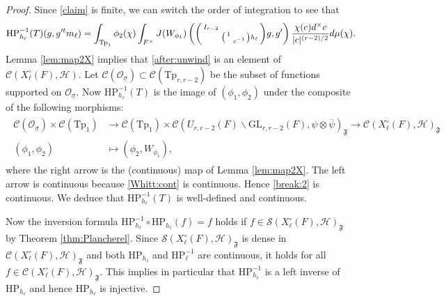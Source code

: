 \documentclass[12pt]{amsart}
\theoremstyle{remark}
\numberwithin{equation}{section}
\newcommand{\GL}{\mathrm{GL}}
\newcommand{\lto}{\longrightarrow}
\theoremstyle{definition}
\newenvironment{psmatrix}
  {\left(\begin{smallmatrix}}
  {\end{smallmatrix}\right)}
\numberwithin{equation}{subsection}
\begin{document}
\begin{proof}
Since \eqref{claim} is finite, we can switch the order of integration to see that 
\begin{align} \label{after:unwind}
\mathrm{HP}_{h_\ell}^{-1}(T)(g,g'^tm_\ell)=\int_{\mathrm{Tp}_1}\phi_2(\chi)\int_{F^\times}
J(W_{\phi_1})\left(\begin{psmatrix}I_{r-2} & \\ & \begin{psmatrix} 1 & \\ & c^{-1} \end{psmatrix}h_\ell \end{psmatrix}g,g' \right)
\frac{\chi(c) d^\times c}{|c|^{(r-2)/2}}d\mu( \chi).
\end{align}
 Lemma \ref{lem:map2X} implies that \eqref{after:unwind} is an element of $\mathcal{C}(X_\ell^\circ(F),\mathcal{H}).$  Let $\mathcal{C}(\mathcal{O}_{\underline{\sigma}}) \subset \mathcal{C}(\mathrm{Tp}_{r,r-2})$ be the subset of functions supported on $\mathcal{O}_{\underline{\sigma}}.$
Now $\mathrm{HP}_{h_\ell}^{-1}(T)$ is the image of $(\phi_1, \phi_2)$ under the composite of the following morphisms:
\begin{align} \label{break:2} \begin{split}
\mathcal{C}(\mathcal{O}_{\underline{\sigma}}) \times \mathcal{C}(\mathrm{Tp}_1) &\lto \mathcal{C}(\mathrm{Tp}_1) \times \mathcal{C}(U_{r,r-2}(F) \backslash \GL_{r,r-2}(F),\psi \otimes \overline{\psi})_{\mathfrak{F}}  \lto  \mathcal{C}(X_\ell^\circ(F),\mathcal{H})_{\mathfrak{F}}\\
(\phi_1, \phi_2) &\longmapsto \left(\phi_2,W_{\phi_1}\right), \end{split}
\end{align}
where the right arrow is the (continuous) map of Lemma \ref{lem:map2X}. The left arrow is continuous because \eqref{Whitt:cont} is continuous.  Hence
  \eqref{break:2} is continuous.    We deduce that $\mathrm{HP}_{h_\ell}^{-1}(T)$ is well-defined and continuous.

Now the inversion formula
$\mathrm{HP}_{h_\ell}^{-1} \circ \mathrm{HP}_{h_\ell}(f)=f$ holds if $f \in \mathcal{S}(X_\ell^\circ(F),\mathcal{H})_{\mathfrak{F}}$ by Theorem \ref{thm:Plancherel}.  Since $\mathcal{S}(X_\ell^\circ(F),\mathcal{H})_{\mathfrak{F}}$ is dense in $\mathcal{C}(X_\ell^\circ(F),\mathcal{H})_{\mathfrak{F}}$ and both $\mathrm{HP}_{h_\ell}$ and $\mathrm{HP}_{\ell}^{-1}$ are continuous, it holds for all $f \in \mathcal{C}(X_\ell^\circ(F),\mathcal{H})_{\mathfrak{F}}.$  This implies in particular that $\mathrm{HP}_{h_\ell}^{-1}$ is a left inverse of $\mathrm{HP}_{h_\ell}$ and hence $\mathrm{HP}_{h_\ell}$ is injective.


\end{proof}
\end{document}
